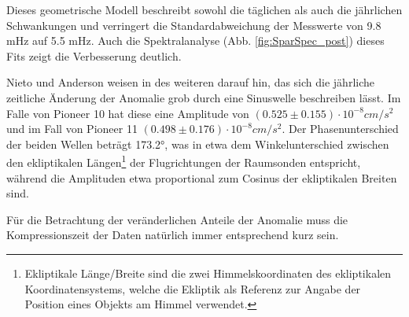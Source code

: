Dieses geometrische Modell beschreibt sowohl die täglichen als auch die jährlichen
Schwankungen und verringert die Standardabweichung der Messwerte von 9.8 mHz auf 5.5 mHz.
Auch die Spektralanalyse (Abb. \ref{fig:SparSpec_post}) dieses Fits zeigt die Verbesserung deutlich\cite{Levy2008}. %

Nieto und Anderson weisen in \cite{Nieto2005} des weiteren darauf hin, das sich die jährliche zeitliche Änderung der Anomalie %
grob durch eine Sinuswelle beschreiben lässt. Im Falle von Pioneer 10 hat diese eine Amplitude von $(0.525\pm0.155)\cdot10^{-8}cm/s^{2}$ und im Fall von Pioneer 11 $(0.498\pm0.176)\cdot10^{-8}cm/s^{2}$. Der Phasenunterschied der beiden Wellen beträgt 173.2°, was in etwa dem Winkelunterschied zwischen den ekliptikalen Längen\footnote{Ekliptikale Länge/Breite sind die zwei Himmelskoordinaten des ekliptikalen Koordinatensystems, welche die Ekliptik als Referenz zur Angabe der Position eines Objekts am Himmel verwendet.} der Flugrichtungen der Raumsonden entspricht, während die Amplituden etwa proportional zum Cosinus der ekliptikalen Breiten sind.

Für die Betrachtung der veränderlichen Anteile der Anomalie muss die Kompressionszeit der Daten natürlich immer entsprechend kurz sein\cite{Nieto2005}.

\FloatBarrier